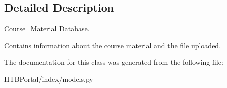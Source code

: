 \subsection{Detailed Description}
\hyperlink{classindex_1_1models_1_1Course__Material}{Course\+\_\+\+Material} Database. 

Contains information about the course material and the file uploaded. 

The documentation for this class was generated from the following file\+:\begin{DoxyCompactItemize}
\item 
I\+I\+T\+B\+Portal/index/models.\+py\end{DoxyCompactItemize}
